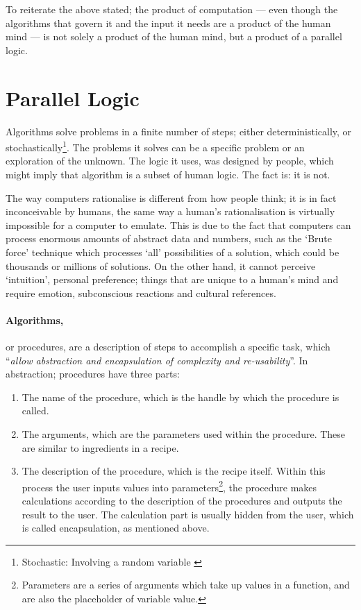 To reiterate the above stated; the product of computation --- even though the algorithms that govern it and the input it needs are a product of the human mind --- is not solely a product of the human mind, but a product of a parallel logic.

\section{Parallel Logic}

Algorithms solve problems in a finite number of steps; either deterministically, or stochastically\footnote{Stochastic: Involving a random variable \cite{merriam03}}. The problems it solves can be a specific problem or an exploration of the unknown. The logic it uses, was designed by people, which might imply that algorithm is a subset of human logic. The fact is: it is not.

The way computers rationalise is different from how people think; it is in fact inconceivable by humans, the same way a human's rationalisation is virtually impossible for a computer to emulate.  This is due to the fact that computers can process enormous amounts of abstract data and numbers, such as the `Brute force' technique which processes `all' possibilities of a solution, which could be thousands or millions of solutions. On the other hand, it cannot perceive `intuition', personal preference; things that are unique to a human's mind and require emotion, subconscious reactions and cultural references.

\paragraph{Algorithms,}or procedures, are a description of steps to accomplish a specific task, which ``\emph{allow abstraction and encapsulation of complexity and re-usability}''\cite{hernandez06}. In abstraction; procedures have three parts:
\begin{enumerate}
  \item The name of the procedure, which is the handle by which the procedure is called.
  \item The arguments, which are the parameters used within the procedure. These are similar to ingredients in a recipe.
  \item The description of the procedure, which is the recipe itself. Within this process the user inputs values into parameters\footnote{Parameters are a series of arguments which take up values in a function, and are also the placeholder of variable value.}, the procedure makes calculations according to the description of the procedures and outputs the result to the user. The calculation part is usually hidden from the user, which is called encapsulation, as mentioned above.
\end{enumerate}

